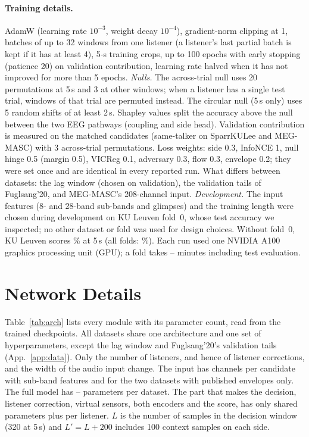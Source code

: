 \documentclass[10pt,twocolumn,letterpaper]{article}
\begin{document}
\paragraph{Training details.} AdamW (learning rate $10^{-3}$, weight decay $10^{-4}$),
gradient-norm clipping at 1, batches of up to 32 windows from one listener (a listener's
last partial batch is kept if it has at least 4), 5-s training crops, up to 100 epochs with
early stopping (patience 20) on validation contribution, learning rate halved when it has not
improved for more than 5 epochs. \emph{Nulls.} The across-trial null uses 20 permutations at 5\,s and 3 at other windows;
when a listener has a single test trial, windows of that trial are permuted instead. The
circular null (5\,s only) uses 5 random shifts of at least 2\,s. Shapley values split the
accuracy above the null between the two EEG pathways (coupling and side head). Validation contribution is measured on the matched
candidates (same-talker on SparrKULee and MEG-MASC) with 3 across-trial permutations. Loss
weights: side 0.3, InfoNCE 1, null hinge 0.5 (margin 0.5), VICReg 0.1, adversary 0.3, flow
0.3, envelope 0.2; they were set once and are identical in every reported run. What differs
between datasets: the lag window (chosen on validation), the validation tails of Fuglsang'20,
and MEG-MASC's 208-channel input. \emph{Development.} The input features (8- and 28-band
sub-bands and glimpses) and the training length were chosen during development on KU Leuven
fold~0, whose test accuracy we inspected; no other dataset or fold was used for design
choices. Without fold~0, KU Leuven scores \kulExFoldZero\% at 5\,s (all folds:
\cfKUL\%). Each run used one NVIDIA A100 graphics processing unit (GPU); a fold takes
\trainMinMin--\trainMinMax{} minutes including test evaluation.

\begin{table}[h]\centering\small
\caption{Canonical 64 vs.\ all native channels (5-s and trial accuracy, \%; 125-ms lag
window, seed 0).}
\label{tab:channels}
\end{table}

\section{Network Details}\label{app:net}

Table~\ref{tab:arch} lists every module with its parameter count, read from the trained
checkpoints. All datasets share one architecture and one set of hyperparameters, except the lag window and
Fuglsang'20's validation tails (App.~\ref{app:data}). Only the
number of listeners, and hence of listener corrections, and the width of the audio input
change. The input has \archAudIn{} channels per candidate with sub-band features and
\archAudInEnv{} for the two datasets with published envelopes only. The full model has
\archTotMin--\archTotMax{} parameters per dataset. The part that makes the decision,
listener correction, virtual sensors, both encoders and the score, has only \archDecision{}
shared parameters plus \archPerListener{} per listener. $L$ is the number of samples in the decision window
(320 at 5\,s) and $L'=L+200$ includes 100 context samples on each side.
\end{document}
